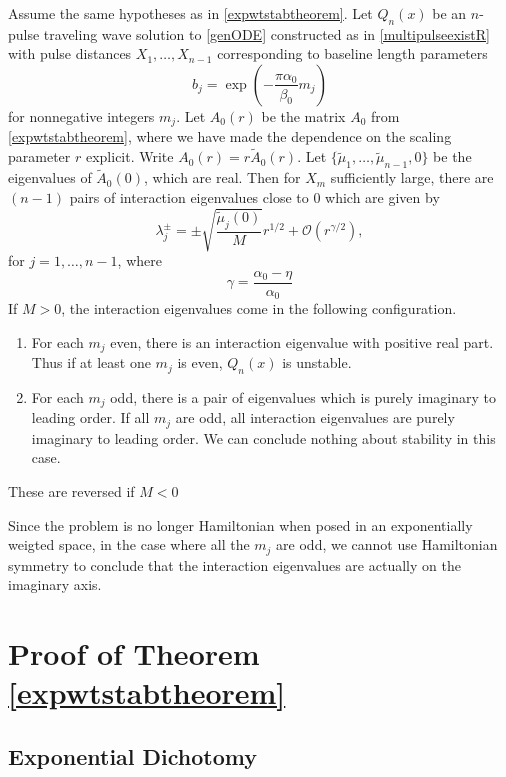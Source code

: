 \documentclass[thesis.tex]{subfiles}
\begin{document}
\begin{corollary}\label{corr:eiglocR}
Assume the same hypotheses as in \cref{expwtstabtheorem}. Let $Q_n(x)$ be an $n$-pulse traveling wave solution to \cref{genODE} constructed as in \cref{multipulseexistR} with pulse distances $X_1, \dots, X_{n-1}$ corresponding to baseline length parameters
\[
b_j = \exp\left(-\frac{\pi \alpha_0}{\beta_0}m_j \right)
\]
for nonnegative integers $m_j$. Let $A_0(r)$ be the matrix $A_0$ from \cref{expwtstabtheorem}, where we have made the dependence on the scaling parameter $r$ explicit. Write $A_0(r) = r \tilde{A}_0(r)$. Let $\{ \tilde{\mu}_1, \dots, \tilde{\mu}_{n-1}, 0 \}$ be the eigenvalues of $\tilde{A}_0(0)$, which are real. Then for $X_m$ sufficiently large, there are $(n-1)$ pairs of interaction eigenvalues close to 0 which are given by
\begin{equation}\label{hominteigs}
\lambda_j^\pm = \pm \sqrt{\frac{\tilde{\mu}_j(0)}{M}} r^{1/2} + 
\mathcal{O}\left( r^{\gamma/2} \right),
\end{equation}
for $j = 1,\dots,n-1$, where
\[
\gamma = \frac{\alpha_0 - \eta}{\alpha_0}
\]
If $M > 0$, the interaction eigenvalues come in the following configuration.
\begin{enumerate}
	\item For each $m_j$ even, there is an interaction eigenvalue with positive real part. Thus if at least one $m_j$ is even, $Q_n(x)$ is unstable.
	\item For each $m_j$ odd, there is a pair of eigenvalues which is purely imaginary to leading order. If all $m_j$ are odd, all interaction eigenvalues are purely imaginary to leading order. We can conclude nothing about stability in this case.
\end{enumerate}
These are reversed if $M < 0$
\end{corollary}

\begin{remark}
Since the problem is no longer Hamiltonian when posed in an exponentially weigted space, in the case where all the $m_j$ are odd, we cannot use Hamiltonian symmetry to conclude that the interaction eigenvalues are actually on the imaginary axis.
\end{remark}

\section{Proof of Theorem \ref{expwtstabtheorem}}

\subsection{Exponential Dichotomy}
\end{document}
